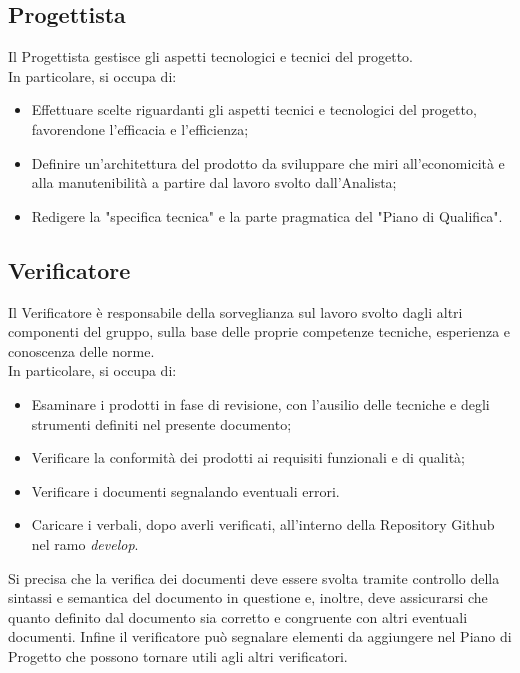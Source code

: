 \subsection{Progettista}
Il Progettista gestisce gli aspetti tecnologici e tecnici del progetto. \\
In particolare, si occupa di:
\begin{itemize}
    \item Effettuare scelte riguardanti gli aspetti tecnici e tecnologici del progetto, favorendone l'efficacia e l'efficienza;
    \item Definire un'architettura del prodotto da sviluppare che miri all'economicità e alla manutenibilità a partire dal lavoro svolto dall'Analista;
    \item Redigere la "specifica tecnica" e la parte pragmatica del "Piano di Qualifica".
\end{itemize}

\subsection{Verificatore}
Il Verificatore è responsabile della sorveglianza sul lavoro svolto dagli altri componenti del gruppo, sulla base delle proprie competenze tecniche, esperienza e conoscenza delle norme. \\
In particolare, si occupa di:
\begin{itemize}
    \item Esaminare i prodotti in fase di revisione, con l'ausilio delle tecniche e degli strumenti definiti nel presente documento;
    \item Verificare la conformità dei prodotti ai requisiti funzionali e di qualità;
    \item Verificare i documenti segnalando eventuali errori.
    \item Caricare i verbali, dopo averli verificati, all'interno della Repository Github nel ramo \textit{develop}.
\end{itemize}
Si precisa che la verifica dei documenti deve essere svolta tramite controllo della sintassi e semantica del documento in questione e, inoltre, deve assicurarsi che quanto definito dal documento sia corretto e congruente con altri eventuali documenti.
Infine il verificatore può segnalare elementi da aggiungere nel Piano di Progetto che possono tornare utili agli altri verificatori. \\
